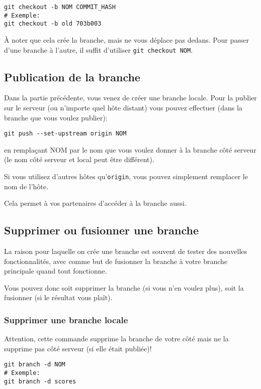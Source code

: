 \documentclass[10pt,a4paper]{article}
\begin{document}
\begin{verbatim}
git checkout -b NOM COMMIT_HASH
# Exemple:
git checkout -b old 703b003
\end{verbatim}

À noter que cela crée la branche, mais ne vous déplace pas dedans. Pour passer d'une branche à l'autre, il suffit d'utiliser \texttt{git checkout NOM}.

\subsection{Publication de la branche}

Dans la partie précédente, vous venez de créer une branche locale. Pour la publier sur le serveur (ou n'importe quel hôte distant) vous pouvez effectuer (dans la branche que vous voulez publier):

\begin{verbatim}
git push --set-upstream origin NOM
\end{verbatim}

en remplaçant NOM par le nom que vous voulez donner à la branche côté serveur (le nom côté serveur et local peut être différent).

Si vous utilisez d'autres hôtes qu'{\tt origin}, vous pouvez simplement remplacer le nom de l'hôte.

Cela permet à vos partenaires d'accéder à la branche aussi.

\subsection{Supprimer ou fusionner une branche\label{end-branch}}

La raison pour laquelle on crée une branche est souvent de tester des nouvelles fonctionnalités, avec comme but de fusionner la branche à votre branche principale quand tout fonctionne.

Vous pouvez donc soit supprimer la branche (si vous n'en voulez plus), soit la fusionner (si le résultat vous plaît).

\subsubsection{Supprimer une branche locale}

Attention, cette commande supprime la branche de votre côté mais ne la supprime pas côté serveur (si elle était publiée)!

\begin{verbatim}
git branch -d NOM
# Exemple:
git branch -d scores
\end{verbatim}
\end{document}
